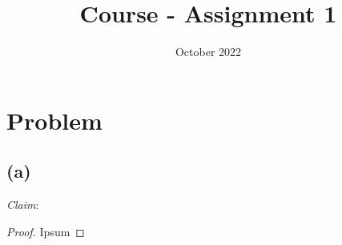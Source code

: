 \documentclass[11pt]{article}
\title{\vspace{-10mm}\bfseries \Small Course - Assignment 1 \vspace{-10mm}}
\date{October 2022}
\begin{document}
\maketitle

\section*{Problem}
\subsection*{(a)}
\textit{Claim}:  
\vspace{3mm}

\begin{proof}
	Ipsum
\end{proof}

	
	
\end{document}
